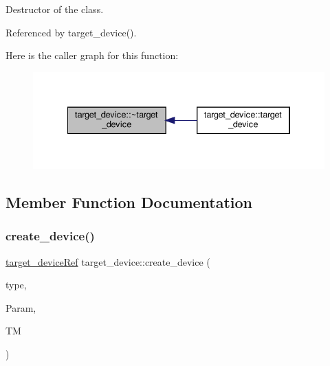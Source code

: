 Destructor of the class. 



Referenced by target\+\_\+device().

Here is the caller graph for this function\+:
\nopagebreak
\begin{figure}[H]
\begin{center}
\leavevmode
\includegraphics[width=334pt]{d9/dd8/classtarget__device_ac217a819b8157d92cf1a8dc69843944c_icgraph}
\end{center}
\end{figure}


\subsection{Member Function Documentation}
\mbox{\label{classtarget__device_a3022132189bcc9f25d4f9091609d461c}} 
\subsubsection{\texorpdfstring{create\+\_\+device()}{create\_device()}}
{\footnotesize\ttfamily \hyperlink{target__device_8hpp_acedb2b7a617e27e6354a8049fee44eda}{target\+\_\+device\+Ref} target\+\_\+device\+::create\+\_\+device (\begin{DoxyParamCaption}\item[{const \hyperlink{target__device_8hpp_a476becc690220f0805ce73006449c732}{Target\+Device\+\_\+\+Type}}]{type,  }\item[{const \hyperlink{Parameter_8hpp_a37841774a6fcb479b597fdf8955eb4ea}{Parameter\+Const\+Ref} \&}]{Param,  }\item[{const \hyperlink{technology__manager_8hpp_a4b9ecd440c804109c962654f9227244e}{technology\+\_\+manager\+Ref} \&}]{TM }\end{DoxyParamCaption})\hspace{0.3cm}{\ttfamily [static]}}



